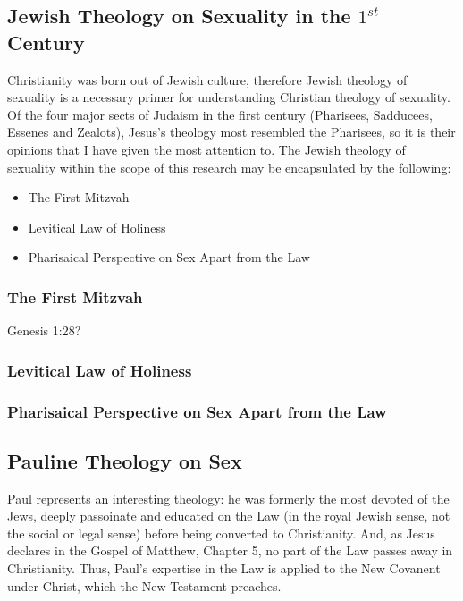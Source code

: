 \documentclass{article}
\begin{document}
\subsection{Jewish Theology on Sexuality in the $1^{st}$ Century}
    Christianity was born out of Jewish culture, therefore Jewish theology
    of sexuality is a necessary primer for understanding Christian theology
    of sexuality. Of the four major sects of Judaism in the first century
    (Pharisees, Sadducees, Essenes and Zealots), Jesus's theology most
    resembled the Pharisees\cite{finkelstein_1929}, so it is their 
    opinions that I have given the most attention to.
    The Jewish theology of sexuality within the scope of this research
    may be encapsulated by the following:
    \begin{itemize}
        \item{The First Mitzvah}
        \item{Levitical Law of Holiness}
        \item{Pharisaical Perspective on Sex Apart from the Law}
    \end{itemize}

    \subsubsection{The First Mitzvah}
        Genesis 1:28?

    \subsubsection{Levitical Law of Holiness}
    \subsubsection{Pharisaical Perspective on Sex Apart from the Law}

\subsection{Pauline Theology on Sex}

    Paul represents an interesting theology: he was formerly the most
    devoted of the Jews, deeply passoinate and educated on the Law (in
    the royal Jewish sense, not the social or legal sense) before being
    converted to Christianity. 
    And, as Jesus declares in the Gospel of Matthew, Chapter 5, no part
    of the Law passes away in Christianity. Thus, Paul's expertise in the
    Law is applied to the New Covanent under Christ, which the New
    Testament preaches.
\end{document}
